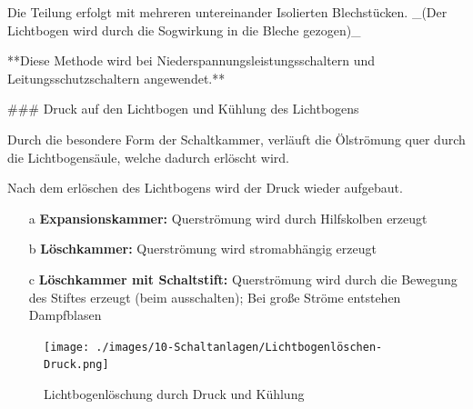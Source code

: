 \begin{markdown}
Die Teilung erfolgt mit mehreren untereinander Isolierten Blechstücken. _(Der Lichtbogen wird durch die Sogwirkung in die Bleche gezogen)_

**Diese Methode wird bei Niederspannungsleistungsschaltern und Leitungsschutzschaltern angewendet.**

\vspace{3em}

### Druck auf den Lichtbogen und Kühlung des Lichtbogens


Durch die besondere Form der Schaltkammer, verläuft die Ölströmung quer durch die Lichtbogensäule, welche dadurch erlöscht wird.

Nach dem erlöschen des Lichtbogens wird der Druck wieder aufgebaut.

\end{markdown}

\begin{enumerate}
    \item[a] \textbf{Expansionskammer:} Querströmung wird durch Hilfskolben erzeugt
    \item[b] \textbf{Löschkammer:} Querströmung wird stromabhängig erzeugt 
    \item[c] \textbf{Löschkammer mit Schaltstift:} Querströmung wird durch die Bewegung des Stiftes erzeugt (beim ausschalten); Bei große Ströme entstehen Dampfblasen   
\end{enumerate}

\begin{figure}[H]
    \centering
    \texttt{[image: ./images/10-Schaltanlagen/Lichtbogenlöschen-Druck.png]}
    \caption[Lichtbogenlöschung durch Druck und Kühlung]{Lichtbogenlöschung durch Druck und Kühlung}
\end{figure}

\newpage

